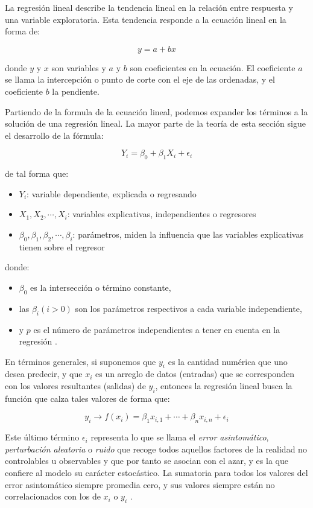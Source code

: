 \documentclass[letterpaper, spanish, 11pt]{report}
\begin{document}
La regresión lineal describe la tendencia lineal en la relación entre respuesta y una variable exploratoria. Esta tendencia responde a la ecuación lineal en la forma de:

\[ y = a + bx\]

donde \(y\) y \(x\) son variables y \(a\) y \(b\) son coeficientes en la ecuación. El coeficiente \(a\) se llama la intercepción o punto de corte con el eje de las ordenadas, y el coeficiente \(b\) la pendiente.

Partiendo de la formula de la ecuación lineal, podemos expander los términos a la solución de una regresión lineal. La mayor parte de la teoría de esta sección sigue el desarrollo de la fórmula:

\[Y_{i} = \beta_{0} + \beta_{1}X_{i} + \epsilon_{i}\]

\noindent de tal forma que:

\begin{itemize}
	\item[] \(Y_{i}\): variable dependiente, explicada o regresando
	\item[] \(X_{1},X_{2},\cdots ,X_{i}\): variables explicativas, independientes o regresores
	\item[] \(\beta_{0},\beta_{1},\beta_{2},\cdots ,\beta_{i}\): parámetros, miden la influencia que las variables explicativas tienen sobre el regresor
\end{itemize}

\noindent donde:

\begin{itemize}
	\item[] \(\beta_0\) es la intersección o término constante,
	\item[] las \(\beta _{i} (i>0)\) son los parámetros respectivos a cada variable independiente,
	\item[] y \(p\) es el número de parámetros independientes a tener en cuenta en la regresión \cite{yakir}.
\end{itemize}

En términos generales, si suponemos que $y_{i}$ es la cantidad numérica que uno desea predecir, y que $x_{i}$ es un arreglo de datos (entradas) que se corresponden con los valores resultantes (salidas) de $y_{i}$, entonces la regresión lineal busca la función que calza tales valores de forma que:

\[ y_{i} \rightarrow f(x_{i}) = \beta_{1}x_{i, 1} + \cdots + \beta_{n}x_{i, n} + \epsilon_{i} \]

Este último término $\epsilon_{i}$ representa lo que se llama el \emph{error asintomático}, \emph{perturbación aleatoria} o \emph{ruido} que recoge todos aquellos factores de la realidad no controlables u observables y que por tanto se asocian con el azar, y es la que confiere al modelo su carácter estocástico. La sumatoria para todos los valores del error asintomático siempre promedia cero, y sus valores siempre están no correlacionados con los de $x_{i}$ o $y_{i}$ \cite{zumelMount}.
\end{document}
